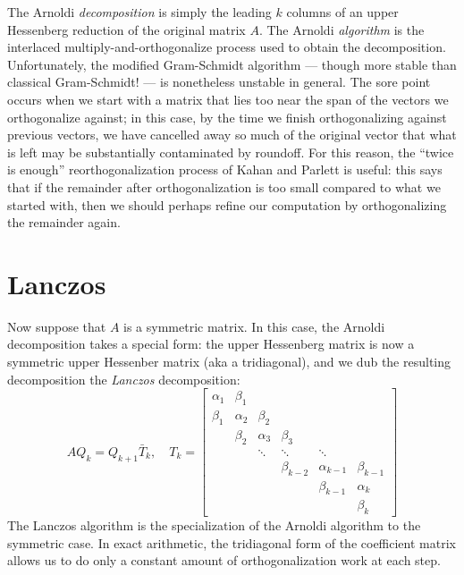 \documentclass[12pt, leqno]{article} %
\begin{document}
The Arnoldi {\em decomposition} is simply the leading $k$ columns of an
upper Hessenberg reduction of the original matrix $A$.  The Arnoldi
{\em algorithm} is the interlaced multiply-and-orthogonalize process
used to obtain the decomposition. %
Unfortunately, the modified Gram-Schmidt algorithm --- though more
stable than classical Gram-Schmidt! --- is nonetheless unstable in
general.  The sore point occurs when we start with a matrix that lies
too near the span of the vectors we orthogonalize against; in this case,
by the time we finish orthogonalizing against previous vectors, we have
cancelled away so much of the original vector that what is left may be
substantially contaminated by roundoff.  For this reason, the
``twice is enough'' reorthogonalization process of Kahan and Parlett
is useful: this says that if the remainder after orthogonalization is
too small compared to what we started with, then we should perhaps
refine our computation by orthogonalizing the remainder again.

\section{Lanczos}

Now suppose that $A$ is a symmetric matrix.  In this case, the Arnoldi
decomposition takes a special form: the upper Hessenberg matrix is now
a symmetric upper Hessenber matrix (aka a tridiagonal), and we dub
the resulting decomposition the {\em Lanczos} decomposition:
\[
  AQ_k = Q_{k+1} \bar{T}_k, \quad
  T_k =
  \begin{bmatrix}
    \alpha_1 & \beta_1 \\
    \beta_1 & \alpha_2 & \beta_2 \\
            & \beta_2 & \alpha_3 & \beta_3 \\
            & & \ddots & \ddots & \ddots \\
            & & & \beta_{k-2} & \alpha_{k-1} & \beta_{k-1} \\
            & & & & \beta_{k-1} & \alpha_k \\
            & & & & & \beta_k
  \end{bmatrix}
\]
The Lanczos algorithm is the specialization of the Arnoldi algorithm
to the symmetric case.  In exact arithmetic, the tridiagonal form of
the coefficient matrix allows us to do only a constant amount of
orthogonalization work at each step.

%
\end{document}
